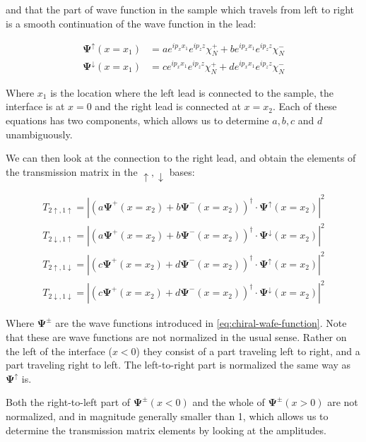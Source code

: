 and that the part of wave function in the sample which travels from left to
right is a smooth continuation of the wave function in the lead:

\begin{align*}
    \mathbf{\Psi^\uparrow}(x=x_1) &=
        a e^{i p_x x_1}e^{i p_z z} \chi_N^+
        + b e^{i p_x x_1}e^{i p_z z} \chi_N^-\\
    \mathbf{\Psi^\downarrow}(x=x_1) &=
        c e^{i p_x x_1}e^{i p_z z} \chi_N^+
        + d e^{i p_x x_1}e^{i p_z z} \chi_N^-
\end{align*}

Where $x_1$ is the location where the left lead is connected to the sample, the
interface is at $x = 0$ and the right lead is connected at $x = x_2$.
Each of these equations has two components, which allows us to determine
$a, b, c$ and $d$ unambiguously.


We can then look at the connection to the right lead, and obtain the 
elements of the transmission matrix in the $\uparrow, \downarrow$ bases:

\begin{align}
    T_{2\uparrow,1\uparrow} = \left| \left( 
        a \mathbf{\Psi^+}(x=x_2) + b  \mathbf{\Psi^-}(x=x_2)
    \right)^\dagger \cdot \mathbf{\Psi}^\uparrow(x=x_2) \right|^2\\
    T_{2\downarrow,1\uparrow} = \left| \left( 
        a \mathbf{\Psi^+}(x=x_2) + b  \mathbf{\Psi^-}(x=x_2)
    \right)^\dagger \cdot \mathbf{\Psi}^\downarrow(x=x_2) \right|^2\\
    T_{2\uparrow,1\downarrow} = \left| \left( 
        c \mathbf{\Psi^+}(x=x_2) + d  \mathbf{\Psi^-}(x=x_2)
    \right)^\dagger \cdot \mathbf{\Psi}^\uparrow(x=x_2) \right|^2\\
    T_{2\downarrow,1\downarrow} = \left| \left( 
        c \mathbf{\Psi^+}(x=x_2) + d  \mathbf{\Psi^-}(x=x_2)
    \right)^\dagger \cdot \mathbf{\Psi}^\downarrow(x=x_2) \right|^2
\end{align}

Where $\mathbf{\Psi^\pm}$ are the wave functions introduced in
\ref{eq:chiral-wafe-function}. Note that these are wave functions are not
normalized in the usual sense. Rather on the left of the interface ($x < 0$)
they consist of a part traveling left to right, and a part traveling right to
left. The left-to-right part is normalized the same way as
$\mathbf{\Psi^\uparrow}$
is.

Both the right-to-left part of $\mathbf{\Psi^\pm}(x < 0)$ and the whole of
$\mathbf{\Psi^\pm}(x > 0)$ are not normalized, and in magnitude generally
smaller than 1, which allows us to determine the transmission matrix elements
by looking at the amplitudes.

